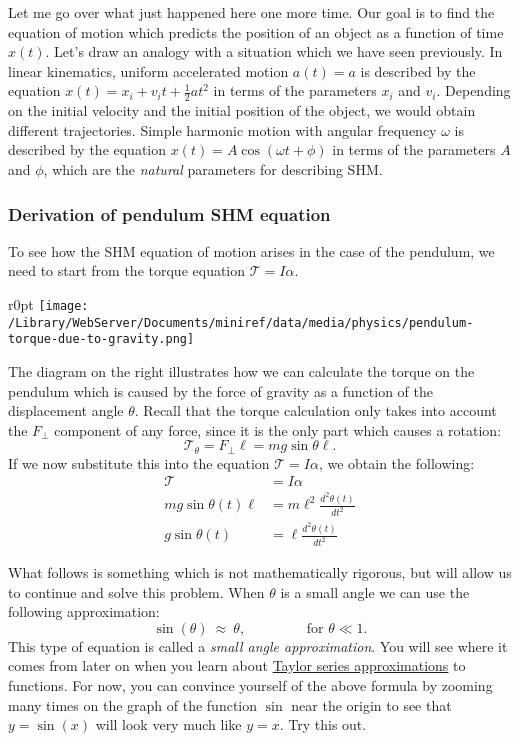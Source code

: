 \documentclass[letterpaper,9pt,journal]{IEEEtran}
\newcommand{\dokuitalic}[1]{\textsl{#1}}
\begin{document}
Let me go over what just happened here one more time.
Our goal is to find the equation of motion which
predicts the position of an object as a function of time $x(t)$.
Let's draw an analogy with a situation which we have seen previously.
In linear kinematics, uniform accelerated motion $a(t)=a$ is described by 
the equation $x(t)=x_i+v_it + \frac{1}{2}at^2$ in terms of the parameters $x_i$ and $v_i$.
Depending on the initial velocity and the initial position of the object,
we would obtain different trajectories.
Simple harmonic motion with angular frequency $\omega$ is described by the
equation $x(t)=A\cos(\omega t + \phi)$ in terms of the parameters $A$ and $\phi$,
which are the \dokuitalic{natural} parameters for describing SHM.


\subsubsection{Derivation of pendulum SHM equation}

To see how the SHM equation of motion arises in the case of the pendulum,
we need to start from the torque equation $\mathcal{T}=I\alpha$. 

\begin{wrapfigure}{r}{0pt}
\texttt{[image: /Library/WebServer/Documents/miniref/data/media/physics/pendulum-torque-due-to-gravity.png]}
\end{wrapfigure}

The diagram on the right illustrates how we can calculate the torque on the pendulum 
which is caused by the force of gravity as a function of the displacement angle $\theta$.
Recall that the torque calculation only takes into account the $F_{\!\perp}$ component
of any force, since it is the only part which causes a rotation:
\[
 \mathcal{T}_\theta  = F_{\!\perp} \ell = mg\sin\theta \ell.
\]
If we now substitute this into the equation $\mathcal{T}=I\alpha$, 
we obtain the following:
\begin{align*}
 \mathcal{T} 		&=	I	\alpha 				\\
  mg\sin\theta(t) \ell	&= 	m\ell^2 \frac{d^2\theta(t)}{dt^2} 	\\
  g\sin\theta(t)	&= 	\ell \frac{d^2\theta(t)}{dt^2} 		
\end{align*}

What follows is something which is not mathematically rigorous, but will allow us to continue
and solve this problem.  When $\theta$ is a small angle we can use the following approximation:
\[
 \sin(\theta)\ \approx  \ \theta,  \qquad \qquad \text{ for } \theta \ll  1.
\]
This type of equation is called a \dokuitalic{small angle approximation}.
You will see where it comes from later on when you learn 
about \hyperref[bef99584217af744e404ed44a33af589]{Taylor series approximations} to functions.
For now, you can convince yourself of the above formula by zooming many
times on the graph of the function $\sin$ near the origin
to see that $y=\sin(x)$ will look very much like $y=x$. 
Try this out.
\end{document}
